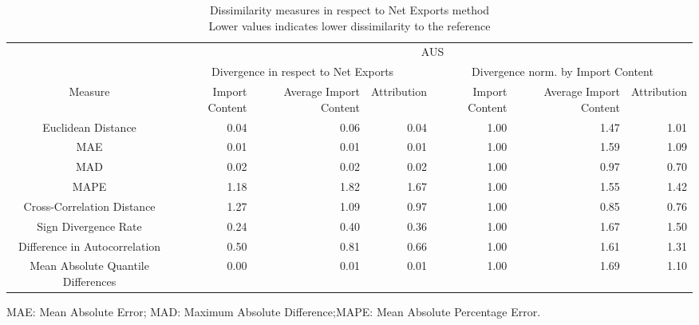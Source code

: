 \begin{table}[t]
\caption*{
{\large Dissimilarity measures in respect to Net Exports method} \\ 
{\small Lower values indicates lower dissimilarity to the reference}
} 
\fontsize{15.0pt}{18.0pt}\selectfont
\begin{tabular*}{\linewidth}{@{\extracolsep{\fill}}crrrrrr}
\toprule
 & \multicolumn{6}{c}{AUS} \\ 
\cmidrule(lr){2-7}
 & \multicolumn{3}{c}{Divergence in respect to Net Exports} & \multicolumn{3}{c}{Divergence norm. by Import Content} \\ 
\cmidrule(lr){2-4} \cmidrule(lr){5-7}
Measure & Import Content & Average Import Content & Attribution & Import Content & Average Import Content & Attribution \\ 
\midrule\addlinespace[2.5pt]
Euclidean Distance & 0.04 & 0.06 & 0.04 & 1.00 & 1.47 & 1.01 \\ 
MAE & 0.01 & 0.01 & 0.01 & 1.00 & 1.59 & 1.09 \\ 
MAD & 0.02 & 0.02 & 0.02 & 1.00 & 0.97 & 0.70 \\ 
MAPE & 1.18 & 1.82 & 1.67 & 1.00 & 1.55 & 1.42 \\ 
Cross-Correlation Distance & 1.27 & 1.09 & 0.97 & 1.00 & 0.85 & 0.76 \\ 
Sign Divergence Rate & 0.24 & 0.40 & 0.36 & 1.00 & 1.67 & 1.50 \\ 
Difference in Autocorrelation & 0.50 & 0.81 & 0.66 & 1.00 & 1.61 & 1.31 \\ 
Mean Absolute Quantile Differences & 0.00 & 0.01 & 0.01 & 1.00 & 1.69 & 1.10 \\ 
\bottomrule
\end{tabular*}
\begin{minipage}{\linewidth}
MAE: Mean Absolute Error; MAD: Maximum Absolute Difference;MAPE: Mean Absolute Percentage Error.\\
\end{minipage}
\end{table}

